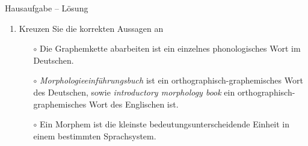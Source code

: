 
\begin{frame}{Hausaufgabe -- Lösung}

\begin{enumerate}
	\item Kreuzen Sie die korrekten Aussagen an %

\begin{itemize}
	\item[$\circ$] Die Graphemkette abarbeiten ist ein einzelnes phonologisches Wort im Deutschen.
	\item[$\circ$] \emph{Morphologieeinführungsbuch} ist ein orthographisch-graphemisches Wort des Deutschen, sowie \emph{introductory morphology book} ein orthographisch-graphemisches Wort des Englischen ist.
	\item[$\circ$] Ein Morphem ist die kleinste bedeutungsunterscheidende Einheit in einem bestimmten Sprachsystem.
\end{itemize}

\end{enumerate}
\end{frame}


